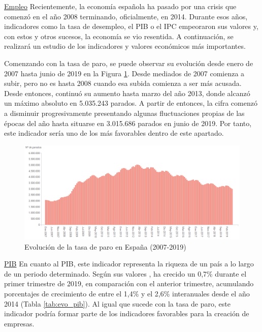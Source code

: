 \noindent\underline{Empleo}\newline
\indent Recientemente, la economía española ha pasado por una crisis que comenzó en el año 2008 terminando, oficialmente, en 2014. Durante esos años, indicadores como la tasa de desempleo, el \acf{PIB} o el \acf{IPC} empeoraron sus valores y, con estos y otros sucesos, la economía se vio resentida. A continuación, se realizará un estudio de los indicadores y valores económicos más importantes.

Comenzando con la tasa de paro, se puede observar su evolución desde enero de 2007 hasta junio de 2019 en la Figura \ref{fig:tasaparo}. Desde mediados de 2007 comienza a subir, pero no es hasta 2008 cuando esa subida comienza a ser más acusada. Desde entonces, continuó su aumento hasta marzo del año 2013, donde alcanzó un máximo absoluto en 5.035.243 parados. A partir de entonces, la cifra comenzó a disminuir progresivamente presentando algunas fluctuaciones propias de las épocas del año hasta situarse en 3.015.686 parados en junio de 2019. Por tanto, este indicador sería uno de los más favorables dentro de este apartado.

\begin{figure}[h]
  \centering
  \includegraphics[width=0.9\linewidth]{figures/images/evolucion_paro.PNG}
  \caption{Evolución de la tasa de paro en España (2007-2019)}
  \label{fig:tasaparo}
\end{figure}

\clearpage

\noindent\underline{\acs{PIB}}\newline
\indent En cuanto al \acs{PIB}, este indicador representa la riqueza de un país a lo largo de un periodo determinado. Según sus valores \cite{pibexpansion}, ha crecido un 0,7\% durante el primer trimestre de 2019, en comparación con el anterior trimestre, acumulando porcentajes de crecimiento de entre el 1,4\% y el 2,6\% interanuales desde el año 2014 (Tabla \ref{tab:evo_pib}). Al igual que sucede con la tasa de paro, este indicador podría formar parte de los indicadores favorables para la creación de empresas.

